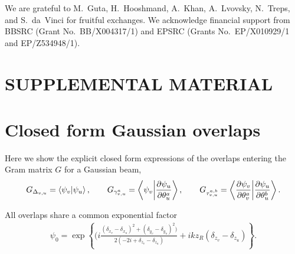 \documentclass[reprint,amsmath,amssymb,aps,prl,floatfix,groupedaddress,superscriptaddress]{revtex4-2}
\begin{document}
\begin{acknowledgments}

We are grateful to M.~Guta, H.~Hooshmand, A.~Khan, A.~Lvovsky, N.~Treps, and S.~da~Vinci for fruitful exchanges.
We acknowledge financial support from BBSRC (Grant No.~BB/X004317/1) and EPSRC (Grants No.~EP/X010929/1 and EP/Z534948/1).
\end{acknowledgments}

%


\clearpage
\appendix
\onecolumngrid
\setcounter{secnumdepth}{2}
\setcounter{figure}{0}
\renewcommand{\thefigure}{S\arabic{figure}}


\section*{SUPPLEMENTAL MATERIAL}

\section{Closed form Gaussian overlaps\label{app:gaussian_overlaps}}
Here we show the explicit closed form expressions of the overlaps entering the Gram matrix $G$ for a Gaussian beam,
\begin{equation}
    G_{\Delta_{v,u}} = \braket{\psi_v}{\psi_u}, \qquad    G_{\gamma^{a}_{v,u}} = \braket{\psi_v}{ \frac{\partial \psi_u}{\partial \theta_u^a}}, \qquad G_{\tau^{a,b}_{v,u}} = \braket{\frac{\partial \psi_v}{\partial \theta_v^a}}{ \frac{\partial \psi_u}{\partial \theta_u^b}}.
    \label{eq:Grammian}
\end{equation}

All overlaps share a common exponential factor
\begin{align}
    \psi_0 = \exp \left \{ (i \frac{(\delta_{x_v} - \delta_{x_u})^2 + (\delta_{y_v} - \delta_{y_u})^2)}{2(-2i + \delta_{z_v} - \delta_{z_u})} + i k z_R (\delta_{z_v} - \delta_{z_u}) \right \}.
\end{align}
\end{document}
